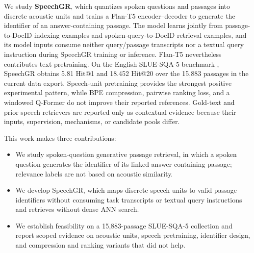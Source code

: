 {We study \textbf{SpeechGR}, which quantizes spoken questions and passages into
discrete acoustic units and trains a Flan-T5 encoder--decoder to generate the
identifier of an answer-containing passage. The model learns jointly from
passage-to-DocID indexing examples and spoken-query-to-DocID retrieval examples,
and its model inputs consume neither query/passage transcripts nor a textual
query instruction during SpeechGR training or inference. Flan-T5 nevertheless
contributes text pretraining. On the English SLUE-SQA-5 benchmark
\citep{Shon2022SLUEPA},
SpeechGR obtains 5.81 Hit@1 and 18.452 Hit@20 over the 15,883 passages in the
current data export. Speech-unit pretraining provides the strongest positive
experimental pattern, while BPE compression, pairwise ranking loss, and a
windowed Q-Former do not improve their reported references. Gold-text and prior
speech retrievers are reported only as contextual evidence because their
inputs, supervision, mechanisms, or candidate pools differ.

This work makes three contributions:
\begin{itemize}
    \item We study spoken-question generative passage retrieval, in which a
    spoken question generates the identifier of its linked answer-containing
    passage; relevance labels are not based on acoustic similarity.
    \item We develop SpeechGR, which maps discrete speech units to valid
    passage identifiers without consuming task transcripts or textual query
    instructions and retrieves without dense ANN search.
    \item We establish feasibility on a 15,883-passage SLUE-SQA-5 collection
    and report scoped evidence on acoustic units, speech pretraining,
    identifier design, and compression and ranking variants that did not help.
\end{itemize}
}

